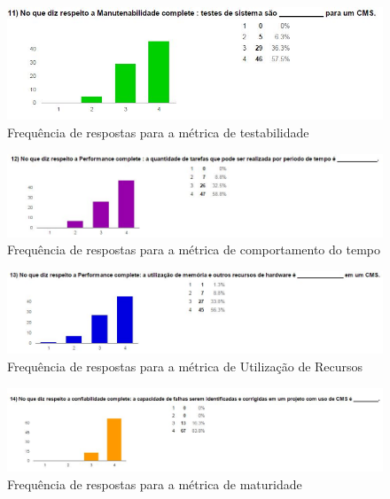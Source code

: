 \begin{figure}[!htb]
\centering
\includegraphics[keepaspectratio=true,scale=0.85]{figuras/Ques_2/q11_fig.jpg}
\caption{Frequência de respostas para a métrica de testabilidade}
\label{res_q2-11}
\end{figure}


\begin{figure}[!htb]
\centering
\includegraphics[keepaspectratio=true,scale=0.65]{figuras/Ques_2/q12_fig.jpg}
\caption{Frequência de respostas para a métrica de comportamento do tempo}
\label{res_q2-12}
\end{figure}

\begin{figure}[!htb]
\centering
\includegraphics[keepaspectratio=true,scale=0.65]{figuras/Ques_2/q13_fig.jpg}
\caption{Frequência de respostas para a métrica de Utilização de Recursos}
\label{res_q2-13}
\end{figure}

\clearpage

\begin{figure}[!htb]
\centering
\includegraphics[keepaspectratio=true,scale=0.6]{figuras/Ques_2/q14_fig.jpg}
\caption{Frequência de respostas para a métrica de maturidade}
\label{res_q2-14}
\end{figure}

